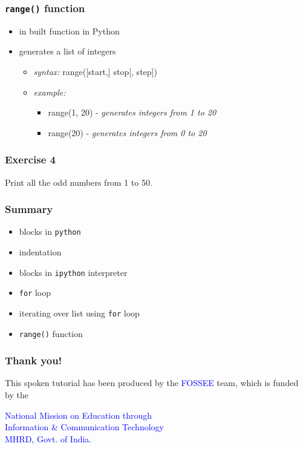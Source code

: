 \documentclass[presentation]{beamer}
\begin{document}
\begin{frame}
\frametitle{\texttt{range()} function}
\label{sec-12}

\begin{itemize}
\item in built function in Python
\item generates a list of integers

\begin{itemize}
\item \emph{syntax:} range([start,] stop[, step])
\item \emph{example:}

\begin{itemize}
\item range(1, 20) - \emph{generates integers from 1 to 20}
\item range(20) - \emph{generates integers from 0 to 20}
\end{itemize}

\end{itemize}

\end{itemize}
\end{frame}
\begin{frame}
\frametitle{Exercise 4}
\label{sec-13}

  Print all the odd numbers from 1 to 50.
\end{frame}
\begin{frame}
\frametitle{Summary}
\label{sec-14}

\begin{itemize}
\item blocks in \texttt{python}
\item indentation
\item blocks in \texttt{ipython} interpreter
\item \texttt{for} loop
\item iterating over list using \texttt{for} loop
\item \texttt{range()} function
\end{itemize}
\end{frame}
\begin{frame}
\frametitle{Thank you!}
\label{sec-15}

  \begin{block}{}
  \begin{center}
  This spoken tutorial has been produced by the
  \textcolor{blue}{FOSSEE} team, which is funded by the 
  \end{center}
  \begin{center}
    \textcolor{blue}{National Mission on Education through \\
      Information \& Communication Technology \\ 
      MHRD, Govt. of India}.
  \end{center}  
  \end{block}
\end{frame}
\end{document}
